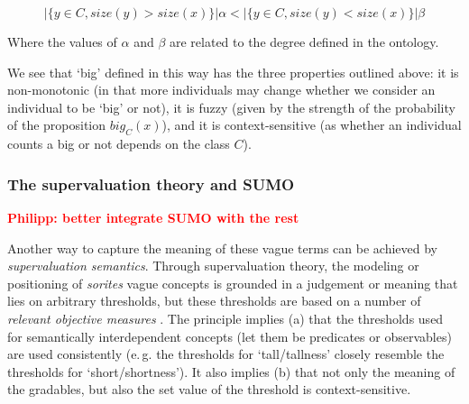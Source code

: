 \documentclass[11pt]{article}
\begin{document}
$$|\{y \in C, size(y) > size(x)\}| \alpha < |\{y \in C, size(y) < size(x)\}| \beta$$

Where the values of $\alpha$ and $\beta$ are related to the degree defined
in the ontology.

We see that `big' defined in this way has the three properties outlined above: 
it is non-monotonic (in that more individuals may change whether we consider an individual 
to be `big' or not), it is fuzzy (given by the strength of the probability of the proposition $big_C(x)$), 
and it is context-sensitive (as whether an individual counts a big or not depends on the class $C$).

\subsubsection{The supervaluation theory and SUMO}

\textbf{\textcolor{red}{Philipp: better integrate SUMO with the rest}}
%


Another way to capture the meaning of these vague terms can be achieved by \textit{supervaluation semantics}. 
Through supervaluation theory, the modeling or positioning of \emph{sorites} vague concepts is grounded in a 
judgement or meaning that lies on arbitrary thresholds, but these thresholds are based on a number of \textit{relevant objective measures} \cite{Bennett06kr}. 
The principle implies (a) that the thresholds used for semantically interdependent concepts 
(let them be predicates or observables) are used consistently (e.\,g. the thresholds for `tall/tallness' 
closely resemble the thresholds for `short/shortness'). It also implies (b) that not only the meaning of 
the gradables, but also the set value of the threshold is context-sensitive.
 
\end{document}
